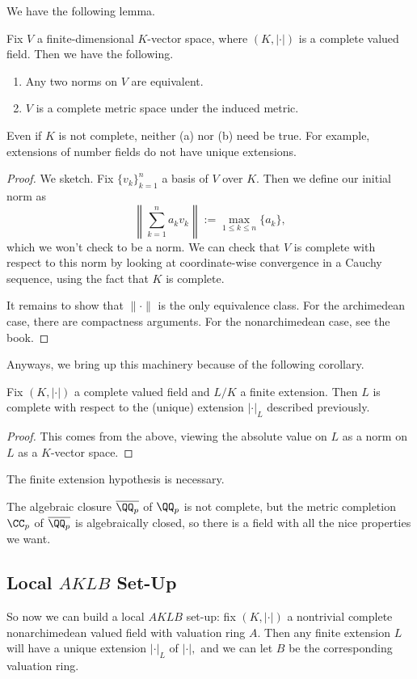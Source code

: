 We have the following lemma.
\begin{lemma}
	Fix $V$ a finite-dimensional $K$-vector space, where $(K,|\cdot|)$ is a complete valued field. Then we have the following.
	\begin{enumerate}[label=(\alph*)]
		\item Any two norms on $V$ are equivalent.
		\item $V$ is a complete metric space under the induced metric.
	\end{enumerate}
\end{lemma}
\begin{remark}
	Even if $K$ is not complete, neither (a) nor (b) need be true. For example, extensions of number fields do not have unique extensions.
\end{remark}
\begin{proof}
	We sketch. Fix $\{v_k\}_{k=1}^n$ a basis of $V$ over $K.$ Then we define our initial norm as
	\[\left\lVert\sum_{k=1}^na_kv_k\right\rVert:=\max_{1\le k\le n}\{a_k\},\]
	which we won't check to be a norm. We can check that $V$ is complete with respect to this norm by looking at coordinate-wise convergence in a Cauchy sequence, using the fact that $K$ is complete.

	It remains to show that $\lVert\cdot\rVert$ is the only equivalence class. For the archimedean case, there are compactness arguments. For the nonarchimedean case, see the book.
\end{proof}
Anyways, we bring up this machinery because of the following corollary.
\begin{corollary}
	Fix $(K,|\cdot|)$ a complete valued field and $L/K$ a finite extension. Then $L$ is complete with respect to the (unique) extension $|\cdot|_L$ described previously.
\end{corollary}
\begin{proof}
	This comes from the above, viewing the absolute value on $L$ as a norm on $L$ as a $K$-vector space.
\end{proof}
The finite extension hypothesis is necessary.
\begin{example}
	The algebraic closure $\overline{\QQ_p}$ of $\QQ_p$ is not complete, but the metric completion $\CC_p$ of $\overline{\QQ_p}$ is algebraically closed, so there is a field with all the nice properties we want.
\end{example}

\subsection{Local \texorpdfstring{$AKLB$}{} Set-Up}
So now we can build a local $AKLB$ set-up: fix $(K,|\cdot|)$ a nontrivial complete nonarchimedean valued field with valuation ring $A.$ Then any finite extension $L$ will have a unique extension $|\cdot|_L$ of $|\cdot|,$ and we can let $B$ be the corresponding valuation ring.

